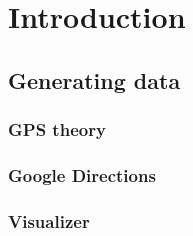 \section{Introduction}

\subsection{Generating data}

\begin{frame}
\frametitle{GPS theory}

\end{frame}

\begin{frame}
\frametitle{Google Directions}

\end{frame}

\begin{frame}
\frametitle{Visualizer}

\end{frame}

